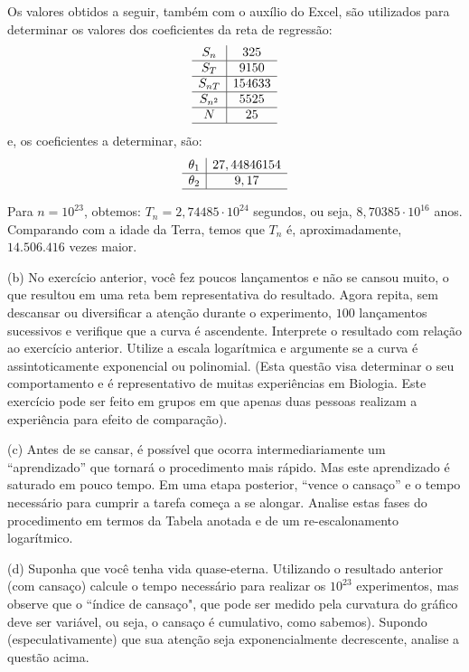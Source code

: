 \begin{exercise}
\begin{description}
{Os valores obtidos a seguir, também com o auxílio do Excel, são utilizados para determinar os valores dos coeficientes da reta de regressão:
\[
\begin{array}{c|c}
S_n & 325 \\ \hline
S_T & 9150 \\ \hline
S_{nT} & 154633 \\ \hline
S_{n^2} & 5525 \\ \hline
N & 25 \\ \hline
\end{array}
\]
e, os coeficientes a determinar, são:
\[
\begin{array}{c|c}
\theta_1 & 27,44846154 \\ \hline
\theta_2 & 9,17 \\ \hline
\end{array}
\]

Para \(n = 10^{23}\), obtemos: \(T_n = 2,74485 \cdot 10^{24}\) segundos, ou seja, \(8,70385 \cdot 10^{16}\) anos. Comparando com a idade da Terra, temos que \(T_n\) é, aproximadamente, \(14.506.416\) vezes maior.
}



\item (b) No exercício anterior, você fez poucos lançamentos e não se cansou muito, o que resultou em uma reta bem representativa do resultado. Agora repita, sem descansar ou diversificar a atenção durante o experimento, \(100\) lançamentos sucessivos e verifique que a curva é ascendente. Interprete o resultado com relação ao exercício anterior. Utilize a escala logarítmica e argumente se a curva é assintoticamente exponencial ou polinomial. (Esta questão visa determinar o seu comportamento e é representativo de muitas experiências em Biologia. Este exercício pode ser feito em grupos em que apenas duas pessoas realizam a experiência para efeito de comparação).

    \item (c) Antes de se cansar, é possível que ocorra intermediariamente um ``aprendizado'' que tornará o procedimento mais rápido. Mas este aprendizado é saturado em pouco tempo. Em uma etapa posterior, ``vence o cansaço'' e o tempo necessário para cumprir a tarefa começa a se alongar. Analise estas fases do procedimento em termos da Tabela anotada e de um re-escalonamento logarítmico.

    \item (d) Suponha que você tenha vida quase-eterna. Utilizando o resultado anterior (com cansaço) calcule o tempo necessário para realizar os \(10^{23}\) experimentos, mas observe que o ``índice de cansaço", que pode ser medido pela curvatura do gráfico deve ser variável, ou seja, o cansaço é cumulativo, como sabemos). Supondo (especulativamente) que sua atenção seja exponencialmente decrescente, analise a questão acima.
    \end{description}
\end{exercise}

